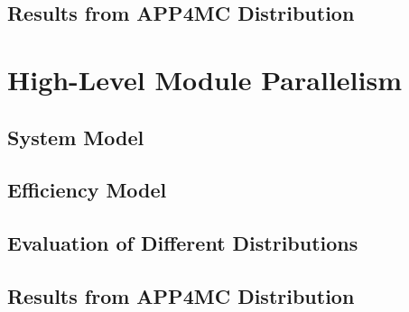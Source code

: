 \subsection{Results from APP4MC Distribution}
\section{High-Level Module Parallelism}
\subsection{System Model}
\subsection{Efficiency Model}
\subsection{Evaluation of Different Distributions}
\subsection{Results from APP4MC Distribution}



